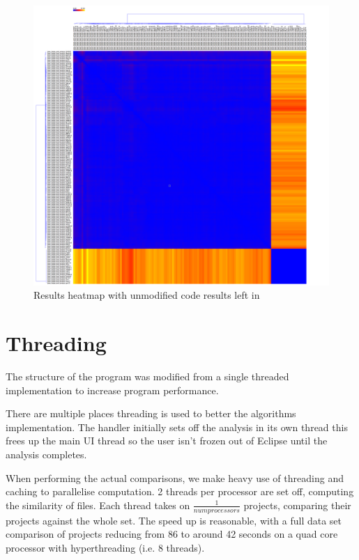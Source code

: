 \begin{figure}[H]
	\centering
		\includegraphics[width=\textwidth]{Figures/LoopArraySkeletonHeatmap}
	\caption{Results heatmap with unmodified code results left in}
	\label{fig:skeletonHeatmap}
\end{figure}

\section{Threading}

The structure of the program was modified from a single threaded implementation to
increase program performance.

There are multiple places threading is used to better the algorithms 
implementation. The handler initially sets off the analysis in its own thread
this frees up the main UI thread so the user isn't frozen out of
Eclipse until the analysis completes.

When performing the actual comparisons, we make heavy use of threading and caching
to parallelise computation. 2 threads per processor are set off, computing the similarity
of files. Each thread takes on $\frac{1}{num processors}$ projects, 
comparing their projects against the whole set. The speed up is reasonable, with
a full data set comparison of projects reducing from 86 to around 42 seconds on
a quad core processor with hyperthreading (i.e. 8 threads).

